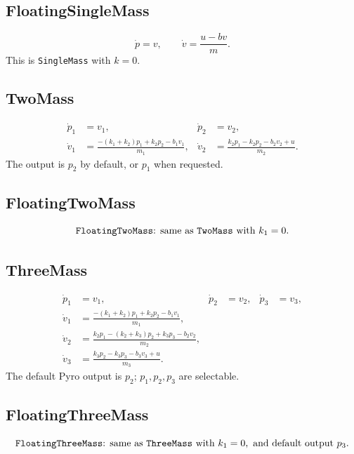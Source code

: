 \documentclass[11pt]{article}
\begin{document}
\subsection{FloatingSingleMass}
\begin{equation}
    \dot p = v,
    \qquad
    \dot v = \frac{u - b v}{m}.
\end{equation}
This is \texttt{SingleMass} with \(k=0\).

\subsection{TwoMass}
\begin{align}
    \dot p_1 &= v_1, &
    \dot p_2 &= v_2, \\
    \dot v_1 &=
        \frac{-(k_1+k_2)p_1 + k_2p_2 - b_1v_1}{m_1}, &
    \dot v_2 &=
        \frac{k_2p_1 - k_2p_2 - b_2v_2 + u}{m_2}.
\end{align}
The output is \(p_2\) by default, or \(p_1\) when requested.

\subsection{FloatingTwoMass}
\begin{equation}
    \text{\texttt{FloatingTwoMass}: same as \texttt{TwoMass} with } k_1=0.
\end{equation}

\subsection{ThreeMass}
\begin{align}
    \dot p_1 &= v_1, &
    \dot p_2 &= v_2, &
    \dot p_3 &= v_3, \\
    \dot v_1 &=
        \frac{-(k_1+k_2)p_1 + k_2p_2 - b_1v_1}{m_1}, \\
    \dot v_2 &=
        \frac{k_2p_1 -(k_2+k_3)p_2 + k_3p_3 - b_2v_2}{m_2}, \\
    \dot v_3 &=
        \frac{k_3p_2-k_3p_3-b_3v_3+u}{m_3}.
\end{align}
The default Pyro output is \(p_2\); \(p_1,p_2,p_3\) are selectable.

\subsection{FloatingThreeMass}
\begin{equation}
    \text{\texttt{FloatingThreeMass}: same as \texttt{ThreeMass} with } k_1=0,
    \text{ and default output } p_3.
\end{equation}
\end{document}
